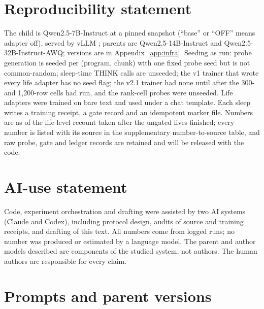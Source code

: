 \documentclass{article}
\begin{document}
\section*{Reproducibility statement}
The child is Qwen2.5-7B-Instruct \citep{qwen2025qwen25} at a pinned snapshot (``base'' or ``OFF'' means adapter off), served by vLLM \citep{kwon2023vllm}; parents are Qwen2.5-14B-Instruct and Qwen2.5-32B-Instruct-AWQ; versions are in Appendix~\ref{app:infra}. Seeding as run: probe generation is seeded per (program, chunk) with one fixed probe seed but is not common-random; sleep-time THINK calls are unseeded; the v1 trainer that wrote every life adapter has no seed flag; the v2.1 trainer had none until after the 300- and 1{,}200-row cells had run, and the rank-cell probes were unseeded. Life adapters were trained on bare text and used under a chat template. Each sleep writes a training receipt, a gate record and an idempotent marker file. Numbers are as of the life-level recount taken after the ungated lives finished; every number is listed with its source in the supplementary number-to-source table, and raw probe, gate and ledger records are retained and will be released with the code.

\section*{AI-use statement}
Code, experiment orchestration and drafting were assisted by two AI systems (Claude and Codex), including protocol design, audits of source and training receipts, and drafting of this text. All numbers come from logged runs; no number was produced or estimated by a language model. The parent and author models described are components of the studied system, not authors. The human authors are responsible for every claim.



\appendix

\section{Prompts and parent versions}
\label{app:prompts}
\end{document}
